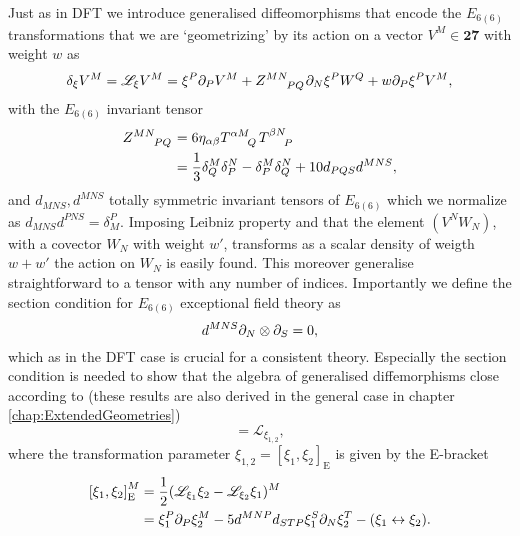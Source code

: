 Just as in DFT we introduce generalised diffeomorphisms that encode the $E_{6(6)}$ transformations that we are `geometrizing' by its action on a vector $V^M\in\mathbf{27}$ with weight $w$ as 
\begin{equation}
    \delta_\xi V^M = \mathscr{L}_\xi V^M = \xi^P\pd_PV^M+\tensor{Z}{^{MN}_{PQ}}\pd_N\xi^P W^Q+w\pd_P\xi^PV^M,
\end{equation}
with the $E_{6(6)}$ invariant tensor
\begin{equation}
    \begin{aligned}
    \tensor{Z}{^{MN}_{PQ}} &= 6\eta_{\alpha\beta}\tensor{T}{^{\alpha M}_Q}\tensor{T}{^{\beta N}_P} \\
    &= \frac{1}{3}\delta^M_Q\delta^N_P-\delta^M_P\delta^N_Q+10d_{PQS}d^{MNS},
    \end{aligned}
\end{equation}
and $d_{MNS},d^{MNS}$ totally symmetric invariant tensors of $E_{6(6)}$ which we normalize as $d_{MNS}d^{PNS}=\delta^P_M$. Imposing Leibniz property and that the element $(V^NW_N)$, with a covector $W_N$ with weight $w'$, transforms as a scalar density of weigth $w+w'$ the action on $W_N$ is easily found. This moreover generalise straightforward to a tensor with any number of indices. Importantly we define the section condition for $E_{6(6)}$ exceptional field theory as 
\begin{equation}
    d^{MNS}\partial_N\otimes\partial_S = 0,
\end{equation}
which as in the DFT case is crucial for a consistent theory. Especially the section condition is needed to show that the algebra of generalised diffemorphisms close according to \cite{E62014} (these results are also derived in the general case in chapter \ref{chap:ExtendedGeometries})
\begin{equation}
    [\mathscr{L}_{\xi_1},\mathscr{L}_{\xi_2}] = \mathscr{L}_{\xi_{1,2}},
\end{equation}
where the transformation parameter $\xi_{1,2}=[\xi_1,\xi_2]_{\text{E}}$ is given by the E-bracket 
\begin{equation}\begin{aligned}
    \left[\xi_1,\xi_2\right]_{\text{E}}^M &= \frac{1}{2}(\mathscr{L}_{\xi_1}\xi_2-\mathscr{L}_{\xi_2}\xi_1)^M\\ &=\xi_1^P\partial_P\xi_2^M-5d^{MNP}d_{STP}\xi_1^S\partial_N\xi_2^T-(\xi_1\leftrightarrow\xi_2).
    \end{aligned}
\end{equation}

